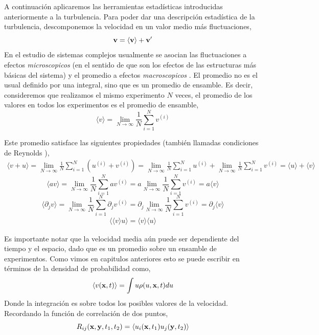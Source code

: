 \documentclass[executivepaper,12pt]{article}
\numberwithin{equation}{section}
\begin{document}
A continuación aplicaremos las herramientas estadísticas introducidas anteriormente a la turbulencia. Para poder dar una descripción estadística de la turbulencia, descomponemos la velocidad en un valor medio más fluctuaciones,
\begin{equation*}
	\vb{v}=\langle \vb{v}\rangle+\vb{v}'
\end{equation*}
En el estudio de sistemas complejos usualmente se asocian las fluctuaciones a efectos \textit{microscopicos} (en el sentido de que son los efectos de las estructuras más básicas del sistema) y el promedio a efectos \textit{macroscopicos} \parencite{nicolis2012}. El promedio no es el usual definido por una integral, sino que es un promedio de ensamble. Es decir, consideremos que realizamos el mismo experimento $N$ veces, el promedio de los valores en todos los experimentos es el promedio de ensamble,
\begin{equation*}
	\langle v\rangle=\lim_{N\to \infty}\frac{1}{N}\sum_{i=1}^{N}v^{(i)}
\end{equation*}

Este promedio satisface las siguientes propiedades (también llamadas condiciones de Reynolds \parencite{monin1976}),
\begin{align*}
	\langle v+u\rangle=\lim_{N\to \infty}\frac{1}{N}\sum_{i=1}^{N}(u^{(i)}+v^{(i)})=\lim_{N\to \infty}\frac{1}{N}\sum_{i=1}^{N}u^{(i)}+\lim_{N\to \infty}\frac{1}{N}\sum_{i=1}^{N}v^{(i)}=\langle u\rangle+\langle v\rangle
\end{align*}
\begin{equation*}
	\langle av\rangle=\lim_{N\to \infty}\frac{1}{N}\sum_{i=1}^{N}av^{(i)}=a\lim_{N\to \infty}\frac{1}{N}\sum_{i=1}^{N}v^{(i)}=a\langle v\rangle
\end{equation*}
\begin{equation*}
	\langle \partial_j v\rangle=\lim_{N\to \infty}\frac{1}{N}\sum_{i=1}^{N}\partial_jv^{(i)}=\partial_j \lim_{N\to \infty}\frac{1}{N}\sum_{i=1}^{N}v^{(i)}=\partial_j \langle v\rangle
\end{equation*}
\begin{align*}
	\langle \langle v\rangle u\rangle=\langle v\rangle\langle u\rangle 
\end{align*}

Es importante notar que la velocidad media aún puede ser dependiente del tiempo y el espacio, dado que es un promedio sobre un ensamble de experimentos. Como vimos en capitulos anteriores esto se puede escribir en términos de la densidad de probabilidad como,
\begin{equation*}
	\langle v(\vb{x},t) \rangle=\int u \rho(u,\vb{x},t)du
\end{equation*}
Donde la integración es sobre todos los posibles valores de la velocidad. Recordando la función de correlación de dos puntos,
\begin{equation*}
	R_{ij}(\vb{x},\vb{y},t_1,t_2)=\langle u_i(\vb{x},t_1)u_j(\vb{y},t_2)\rangle
\end{equation*}
\end{document}
